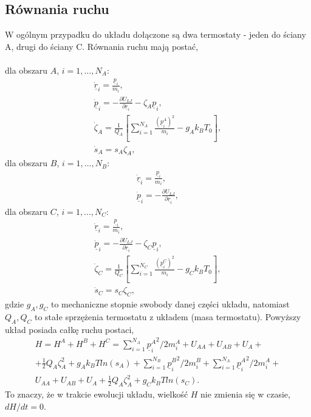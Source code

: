 \documentclass[12pt,a4paper,openright]{report} %
\begin{document}
\subsection{Równania ruchu}
W ogólnym przypadku do układu dołączone są dwa termostaty - jeden do ściany A, drugi do ściany C. Równania ruchu mają postać,
\\
\\
dla obszaru $A$, $i = 1,..., N_A$:
%
\begin{equation}
\begin{gathered}
\underline{\dot{r}}_i=\frac{\underline{p}_i}{m_i},\\
\underline{\dot{p}}_i=-\frac{\partial U_{LJ}}{\partial \underline{r}_i} - \zeta_{A}\underline{p}_i,\\
\dot{\zeta}_A=\frac{1}{Q_A} \left[ \sum_{i=1}^{N_A} \frac{{(\underline{p}^A_i)^2}}{m_i} -g_A k_B T_0 \right], \\
\dot{s}_A=s_A \zeta_A,
\end{gathered}
\end{equation}
%
dla obszaru $B$, $i = 1,..., N_B$:
%
\begin{equation}
\begin{gathered}
\underline{\dot{r}}_i=\frac{\underline{p}_i}{m_i},\\
\underline{\dot{p}}_i=-\frac{\partial U_{LJ}}{\partial \underline{r}_i},
\end{gathered}
\end{equation}
%
dla obszaru $C$, $i = 1,..., N_C$:
%
\begin{equation}
\begin{gathered}
\underline{\dot{r}}_i=\frac{\underline{p}_i}{m_i},\\
\underline{\dot{p}}_i=-\frac{\partial U_{LJ}}{\partial \underline{r}_i} - \zeta_{C}\underline{p}_i,\\
\dot{\zeta}_C=\frac{1}{Q_C} \left[ \sum_{i=1}^{N_C} \frac{{(\underline{p}^C_i)^2}}{m_i} -g_C k_B T_0 \right], \\
\dot{s}_C=s_C \zeta_C,
\end{gathered}
\end{equation}
%
gdzie $g_A, g_C$ to mechaniczne stopnie swobody danej części układu, natomiast $Q_A, Q_C$ to stałe sprzężenia termostatu z układem (masa termostatu).
Powyższy układ posiada całkę ruchu postaci,
\begin{equation}
\begin{gathered}
H=H^A+H^B+H^C=\sum_{i=1}^{N_A} {\underline{p}^A_i}^2/2m_i^A+U_{AA}+U_{AB}+U_A + \\ 
+ \frac{1}{2} Q_A \zeta^2_A+ g_A k_B T ln(s_A)+ \sum_{i=1}^{N_B}{\underline{p}^B_i}^2/2m_i^B+ \sum_{i=1}^{N_A} {\underline{p}^A_i}^2/2m_i^A+ 
\\ U_{AA}+U_{AB}+U_A + \frac{1}{2} Q_A \zeta^2_A + g_C k_B T ln(s_C).
\end{gathered}
\end{equation}
%
To znaczy, że w trakcie ewolucji układu, wielkość $H$ nie zmienia się w czasie, $dH/dt = 0$. 
%
\end{document}
